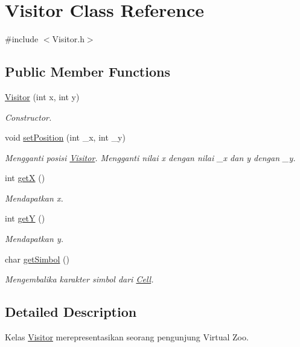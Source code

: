 \hypertarget{classVisitor}{\section{Visitor Class Reference}
\label{classVisitor}
}


{\ttfamily \#include $<$Visitor.\-h$>$}

\subsection*{Public Member Functions}
\begin{DoxyCompactItemize}
\item 
\hyperlink{classVisitor_a73c62326925085bc688ab3fa79aec89e}{Visitor} (int x, int y)
\begin{DoxyCompactList}\small\item\em Constructor. \end{DoxyCompactList}\item 
void \hyperlink{classVisitor_abf1e294584ed3abe9cba6fb7409c1369}{set\-Position} (int \-\_\-x, int \-\_\-y)
\begin{DoxyCompactList}\small\item\em Mengganti posisi \hyperlink{classVisitor}{Visitor}. Mengganti nilai x dengan nilai \-\_\-x dan y dengan \-\_\-y. \end{DoxyCompactList}\item 
int \hyperlink{classVisitor_a1f74a7a66bc78ff28057487dbcebeadc}{get\-X} ()
\begin{DoxyCompactList}\small\item\em Mendapatkan x. \end{DoxyCompactList}\item 
int \hyperlink{classVisitor_a84915508e574b1ffd34c909e1e5a1ce7}{get\-Y} ()
\begin{DoxyCompactList}\small\item\em Mendapatkan y. \end{DoxyCompactList}\item 
char \hyperlink{classVisitor_ae932b0b4eaefabd29d2515134cfe948c}{get\-Simbol} ()
\begin{DoxyCompactList}\small\item\em Mengembalika karakter simbol dari \hyperlink{classCell}{Cell}. \end{DoxyCompactList}\end{DoxyCompactItemize}


\subsection{Detailed Description}
Kelas \hyperlink{classVisitor}{Visitor} merepresentasikan seorang pengunjung Virtual Zoo. 

